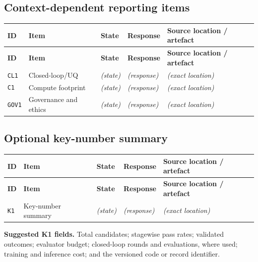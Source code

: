 \documentclass[10pt]{article}
\newcommand{\ResponseTableHeader}{%
\toprule
\textbf{ID} & \textbf{Item} & \textbf{State} & \textbf{Response} & \textbf{Source location / artefact}\\
\midrule}
\begin{document}
\subsection*{Context-dependent reporting items}

\begin{longtable}{@{}L{0.05\textwidth} N{0.16\textwidth} L{0.14\textwidth} L{0.37\textwidth} L{0.20\textwidth}@{}}
\ResponseTableHeader
\endfirsthead
\ResponseTableHeader
\endhead
\bottomrule
\endfoot
\texttt{CL1} & Closed-loop/UQ & \emph{(state)} & \emph{(response)} & \emph{(exact location)}\\
\texttt{C1} & Compute footprint & \emph{(state)} & \emph{(response)} & \emph{(exact location)}\\
\texttt{GOV1} & Governance and ethics & \emph{(state)} & \emph{(response)} & \emph{(exact location)}\\
\end{longtable}

\subsection*{Optional key-number summary}

\begin{longtable}{@{}L{0.05\textwidth} N{0.16\textwidth} L{0.14\textwidth} L{0.37\textwidth} L{0.20\textwidth}@{}}
\ResponseTableHeader
\endfirsthead
\ResponseTableHeader
\endhead
\bottomrule
\endfoot
\texttt{K1} & Key-number summary & \emph{(state)} & \emph{(response)} & \emph{(exact location)}\\
\end{longtable}

\noindent\footnotesize\textbf{Suggested K1 fields.} Total candidates; stagewise pass rates; validated outcomes; evaluator budget; closed-loop rounds and evaluations, where used; training and inference cost; and the versioned code or record identifier.
\end{document}
